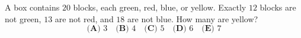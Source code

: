A box contains $20$ blocks, each green, red, blue, or yellow. Exactly $12$ blocks are not green, $13$ are not red, and $18$ are not blue. How many are yellow?
\[\textbf{(A) }3\quad\textbf{(B) }4\quad\textbf{(C) }5\quad\textbf{(D) }6\quad\textbf{(E) }7\]
